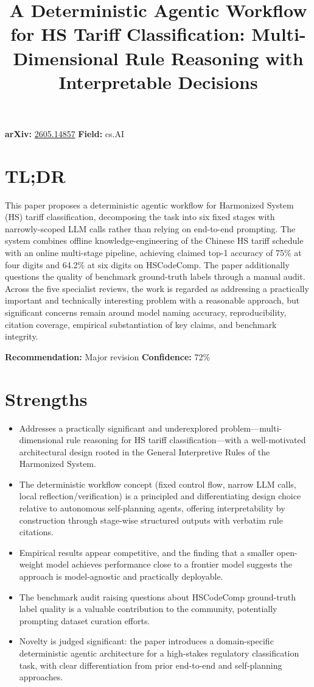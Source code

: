 \documentclass[11pt]{article}
\title{A Deterministic Agentic Workflow for HS Tariff Classification: Multi-Dimensional Rule Reasoning with Interpretable Decisions}
\date{}
\begin{document}
\maketitle

\noindent\textbf{arXiv:} \href{https://arxiv.org/abs/2605.14857}{2605.14857} \quad \textbf{Field:} cs.AI\\

\section*{TL;DR}
This paper proposes a deterministic agentic workflow for Harmonized System (HS) tariff classification, decomposing the task into six fixed stages with narrowly-scoped LLM calls rather than relying on end-to-end prompting. The system combines offline knowledge-engineering of the Chinese HS tariff schedule with an online multi-stage pipeline, achieving claimed top-1 accuracy of 75\% at four digits and 64.2\% at six digits on HSCodeComp. The paper additionally questions the quality of benchmark ground-truth labels through a manual audit. Across the five specialist reviews, the work is regarded as addressing a practically important and technically interesting problem with a reasonable approach, but significant concerns remain around model naming accuracy, reproducibility, citation coverage, empirical substantiation of key claims, and benchmark integrity.

\textbf{Recommendation:} Major revision \quad \textbf{Confidence:} 72\%\\

\section*{Strengths}
\begin{itemize}[leftmargin=*]
  \item Addresses a practically significant and underexplored problem—multi-dimensional rule reasoning for HS tariff classification—with a well-motivated architectural design rooted in the General Interpretive Rules of the Harmonized System.
  \item The deterministic workflow concept (fixed control flow, narrow LLM calls, local reflection/verification) is a principled and differentiating design choice relative to autonomous self-planning agents, offering interpretability by construction through stage-wise structured outputs with verbatim rule citations.
  \item Empirical results appear competitive, and the finding that a smaller open-weight model achieves performance close to a frontier model suggests the approach is model-agnostic and practically deployable.
  \item The benchmark audit raising questions about HSCodeComp ground-truth label quality is a valuable contribution to the community, potentially prompting dataset curation efforts.
  \item Novelty is judged significant: the paper introduces a domain-specific deterministic agentic architecture for a high-stakes regulatory classification task, with clear differentiation from prior end-to-end and self-planning approaches.
\end{itemize}
\end{document}
